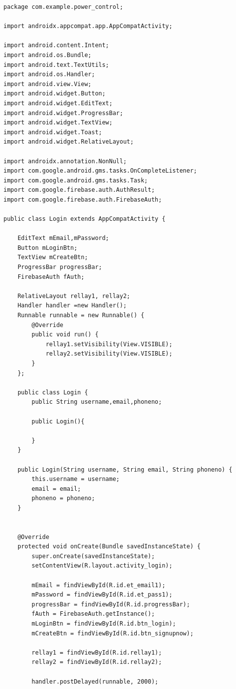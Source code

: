 \documentclass[12pt,a4paper]{article}
\begin{document}
\begin{lstlisting}[frame=single]
package com.example.power_control;

import androidx.appcompat.app.AppCompatActivity;

import android.content.Intent;
import android.os.Bundle;
import android.text.TextUtils;
import android.os.Handler;
import android.view.View;
import android.widget.Button;
import android.widget.EditText;
import android.widget.ProgressBar;
import android.widget.TextView;
import android.widget.Toast;
import android.widget.RelativeLayout;

import androidx.annotation.NonNull;
import com.google.android.gms.tasks.OnCompleteListener;
import com.google.android.gms.tasks.Task;
import com.google.firebase.auth.AuthResult;
import com.google.firebase.auth.FirebaseAuth;

public class Login extends AppCompatActivity {

    EditText mEmail,mPassword;
    Button mLoginBtn;
    TextView mCreateBtn;
    ProgressBar progressBar;
    FirebaseAuth fAuth;

    RelativeLayout rellay1, rellay2;
    Handler handler =new Handler();
    Runnable runnable = new Runnable() {
        @Override
        public void run() {
            rellay1.setVisibility(View.VISIBLE);
            rellay2.setVisibility(View.VISIBLE);
        }
    };

    public class Login {
        public String username,email,phoneno;

        public Login(){

        }
    }

    public Login(String username, String email, String phoneno) {
        this.username = username;
        email = email;
        phoneno = phoneno;
    }


    @Override
    protected void onCreate(Bundle savedInstanceState) {
        super.onCreate(savedInstanceState);
        setContentView(R.layout.activity_login);

        mEmail = findViewById(R.id.et_email1);
        mPassword = findViewById(R.id.et_pass1);
        progressBar = findViewById(R.id.progressBar);
        fAuth = FirebaseAuth.getInstance();
        mLoginBtn = findViewById(R.id.btn_login);
        mCreateBtn = findViewById(R.id.btn_signupnow);

        rellay1 = findViewById(R.id.rellay1);
        rellay2 = findViewById(R.id.rellay2);

        handler.postDelayed(runnable, 2000);


\end{lstlisting}
\end{document}
